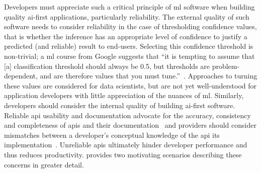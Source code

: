 Developers must appreciate such a critical principle of \gls{ml} software when building quality \gls{ai}-first applications, particularly reliability. The external quality of such software needs to consider reliability in the case of thresholding confidence values, that is whether the inference has an appropriate level of confidence to justify a predicted (and reliable) result to end-users. Selecting this confidence threshold is non-trivial; a \gls{ml} course from Google suggests that ``it is tempting to assume that [a] classification threshold should always be 0.5, but thresholds are problem-dependent, and are therefore values that you must tune.''~. Approaches to turning these values are considered for data scientists, but are not yet well-understood for application developers with little appreciation of the nuances of \gls{ml}. Similarly, developers should consider the internal quality of building \gls{ai}-first software. Reliable \gls{api} usability and documentation advocate for the accuracy, consistency and completeness of \glspl{api} and their documentation~\citep{Piccioni:2013em,Robillard:2009uk} and providers should consider mismatches between a developer's conceptual knowledge of the \gls{api} its implementation~\citep{Ko:2011fb}. Unreliable \glspl{api} ultimately hinder developer performance and thus reduces productivity.  provides two motivating scenarios describing these concerns in greater detail.
%
%
%

